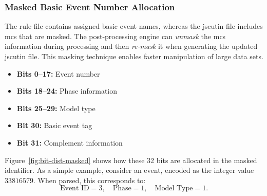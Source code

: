 \subsubsection{Masked Basic Event Number Allocation}
\label{sec:masked-event-allocation}

The rule file contains assigned basic event names, whereas the \acrshort{jscutin} file includes \acrshort{mcs} that are masked. The post-processing engine can \emph{unmask} the \acrshort{mcs} information during processing and then \emph{re-mask} it when generating the updated \acrshort{jscutin} file. This masking technique enables faster manipulation of large data sets.

\begin{itemize}
    \item \textbf{Bits 0--17:} Event number
    \item \textbf{Bits 18--24:} Phase information
    \item \textbf{Bits 25--29:} Model type
    \item \textbf{Bit 30:} Basic event tag
    \item \textbf{Bit 31:} Complement information
\end{itemize}

\noindent Figure~\ref{fig:bit-dist-masked} shows how these 32 bits are allocated in the masked identifier. As a simple example, consider an event, encoded as the integer value \(\displaystyle 33816579\). When parsed, this corresponds to: \[
\text{Event ID} = 3, \quad
\text{Phase} = 1, \quad
\text{Model Type} = 1.
\]

